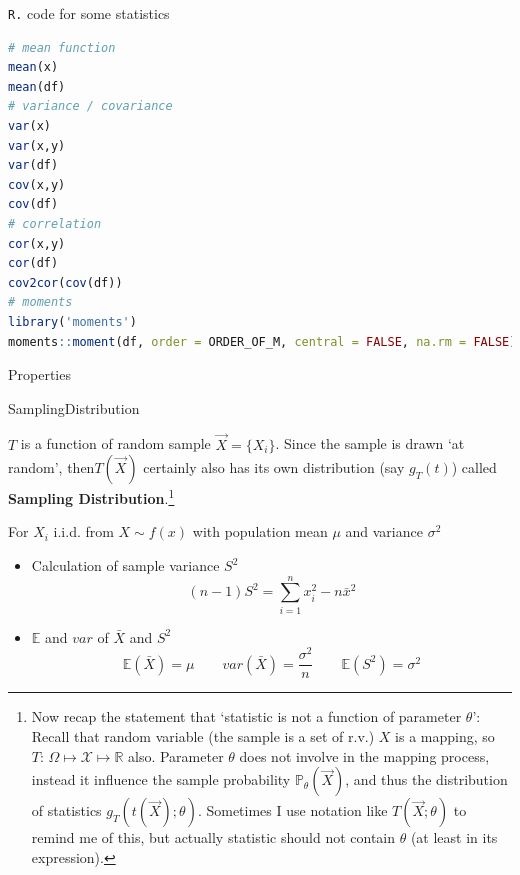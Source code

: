 \begin{rcode}
    \lstinline|R.| code for some statistics
\begin{lstlisting}[language=R]
# mean function
mean(x)
mean(df)
# variance / covariance
var(x)
var(x,y)
var(df)
cov(x,y)
cov(df)
# correlation
cor(x,y)
cor(df)
cov2cor(cov(df))
# moments
library('moments')
moments::moment(df, order = ORDER_OF_M, central = FALSE, na.rm = FALSE)
\end{lstlisting}
\end{rcode}

    \begin{point}
        Properties
    \end{point}
    
    \hypertarget{Statistic}{SamplingDistribution} $T$ is a function of random sample $\vec{X}=\{X_i\}$. Since the sample is drawn `at random', then$ T(\vec{X}) $ certainly also has its own distribution (say $g_T(t)$) called \textbf{Sampling Distribution}.\footnote{Now recap the statement that `statistic is not a function of parameter $ \theta  $': Recall that random variable (the sample is a set of r.v.) $ X $ is a mapping, so $ T:\,\Omega \mapsto \mathscr{X}\mapsto \mathbb{R} $ also. Parameter $ \theta  $ does not involve in the mapping process, instead it influence the sample probability $ \mathbb{P}_\theta(\vec{X}) $, and thus the distribution of statistics $ g_T(t(\vec{X});\theta ) $. Sometimes I use notation like $ T(\vec{X};\theta ) $ to remind me of this, but actually statistic should not contain $ \theta  $ (at least in its expression).}

        For $X_i$ i.i.d. from $X\sim f(x)$ with population mean $\mu$ and variance $\sigma^2$
    \begin{itemize}
        \item Calculation of sample variance $S^2$
        \begin{equation}(n-1)S^2=\sum_{i=1}^n x_i^2-n\bar{x}^2\end{equation}
        \item $\mathbb{E}$ and $var$ of $\bar{X}$ and $S^2$
        \begin{equation}\mathbb{E}(\bar{X})=\mu\qquad var(\bar{X})=\frac{\sigma^2}{n}\qquad \mathbb{E}(S^2)=\sigma^2\end{equation}
    \end{itemize}

